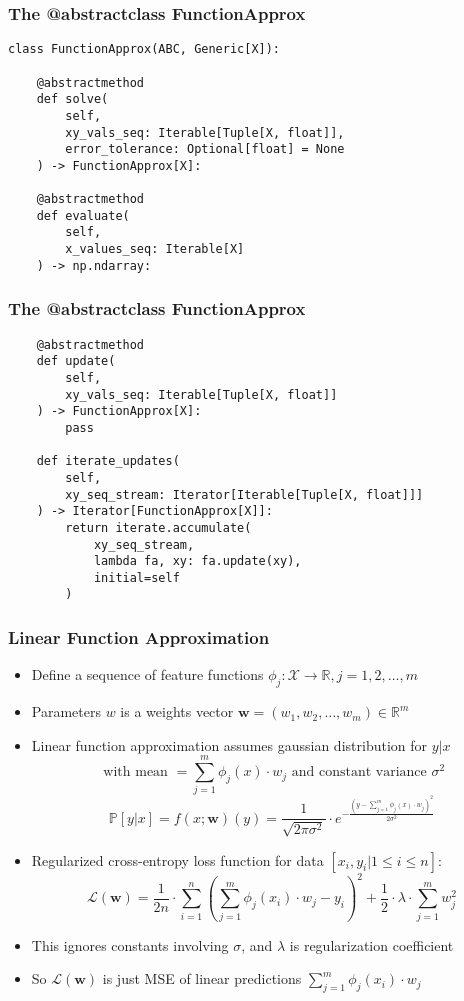 \documentclass[handout]{beamer}
\begin{document}
\begin{frame}[fragile]
\frametitle{The @abstractclass FunctionApprox}
\pause
\begin{lstlisting}
class FunctionApprox(ABC, Generic[X]):

    @abstractmethod
    def solve(
        self,
        xy_vals_seq: Iterable[Tuple[X, float]],
        error_tolerance: Optional[float] = None
    ) -> FunctionApprox[X]:
    
    @abstractmethod
    def evaluate(
        self,
        x_values_seq: Iterable[X]
    ) -> np.ndarray:
\end{lstlisting}
\end{frame}

\begin{frame}[fragile]
\frametitle{The @abstractclass FunctionApprox}
\pause
\begin{lstlisting}
    @abstractmethod
    def update(
        self,
        xy_vals_seq: Iterable[Tuple[X, float]]
    ) -> FunctionApprox[X]:
        pass
        
    def iterate_updates(
        self,
        xy_seq_stream: Iterator[Iterable[Tuple[X, float]]]
    ) -> Iterator[FunctionApprox[X]]:
        return iterate.accumulate(
            xy_seq_stream,
            lambda fa, xy: fa.update(xy),
            initial=self
        )   
\end{lstlisting}
\end{frame}


\begin{frame}
\frametitle{Linear Function Approximation}
\pause
\begin{itemize}[<+->]
\item Define a sequence of feature functions $\phi_j: \mathcal{X} \rightarrow \mathbb{R}, j = 1, 2, \ldots, m$
\item Parameters $w$ is a weights vector $\bm{w} = (w_1, w_2, \ldots, w_m) \in \mathbb{R}^m$
\item Linear function approximation assumes gaussian distribution for $y|x$
$$\text{ with mean } = \sum_{j=1}^m \phi_j(x) \cdot w_j \text{ and constant variance } \sigma^2$$
$$\mathbb{P}[y|x] = f(x;\bm{w})(y) = \frac {1} {\sqrt{2\pi \sigma^2}} \cdot e^{-\frac {(y - \sum_{j=1}^m \phi_j(x) \cdot w_j)^2} {2\sigma^2}}$$
\item Regularized cross-entropy loss function for data $[x_i, y_i|1 \leq i \leq n]$:
$$\mathcal{L}(\bm{w}) = \frac 1 {2n} \cdot \sum_{i=1}^n (\sum_{j=1}^m \phi_j(x_i) \cdot w_j - y_i)^2 + \frac 1 2 \cdot\lambda \cdot \sum_{j=1}^m w_j^2$$
\item This ignores constants involving $\sigma$, and $\lambda$ is regularization coefficient
\item So $\mathcal{L}(\bm{w})$ is just MSE of linear predictions $\sum_{j=1}^m \phi_j(x_i) \cdot w_j$
\end{itemize}
\end{frame}
\end{document}
